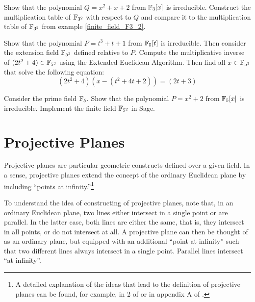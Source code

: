 \begin{exercise} Show that the polynomial $Q=x^2+x+2$ from $\mathbb{F}_3[x]$ is irreducible. Construct the multiplication table of $\mathbb{F}_{3^2}$ with respect to $Q$ and compare it to the multiplication table of $\mathbb{F}_{3^2}$ from example \ref{finite_field_F3_2}.
\end{exercise}

\begin{exercise} Show that the polynomial $P=t^3+t+1$ from $\mathbb{F}_5[t]$ is irreducible. Then consider the extension field $\mathbb{F}_{5^3}$ defined relative to $P$. Compute the multiplicative inverse of $(2t^2+4)\in\mathbb{F}_{5^3}$ using the Extended Euclidean Algorithm. Then find all $x\in\mathbb{F}_{5^3}$ that solve the following equation:
\begin{equation}
(2t^2+4)(x-(t^2+4t+2))= (2t+3)
\end{equation}
\end{exercise}

\begin{exercise}
\label{exercise:finite_fieldF5_2} Consider the prime field $\mathbb{F}_5$. Show that the polynomial $P=x^2+2$ from $\mathbb{F}_5[x]$ is irreducible. Implement the finite field $\mathbb{F}_{5^2}$ in Sage.
\end{exercise}

\section{Projective Planes}\label{sec:planes}
Projective planes are particular geometric constructs defined over a given field. In a sense, projective planes extend the concept of the ordinary Euclidean plane by including ``points at infinity.''\footnote{A detailed explanation of the ideas that lead to the definition of projective planes can be found, for example, in \chaptname{} 2 of \cite{ellis-1992} or in appendix A of \cite{silverman-1994}.}

To understand the idea of constructing of projective planes, note that, in an ordinary Euclidean plane, two lines either intersect in a single point or are parallel. In the latter case, both lines are either the same, that is, they intersect in all points, or do not intersect at all. A projective plane can then be thought of as an ordinary plane, but equipped with an additional ``point at infinity'' such that two different lines always intersect in a single point. Parallel lines intersect ``at infinity''.

